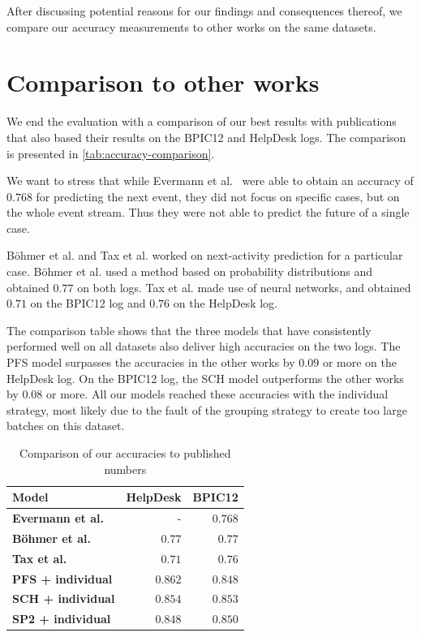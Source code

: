 After discussing potential reasons for our findings and consequences thereof, we compare our accuracy measurements to other works on the same datasets.

\section{Comparison to other works}
We end the evaluation with a comparison of our best results with publications that also based their results on the BPIC12 and HelpDesk logs.
The comparison is presented in \autoref{tab:accuracy-comparison}.

We want to stress that while Evermann et al.~\cite{evermann2016} were able to obtain an accuracy of $0.768$ for predicting the next event, they did not focus on specific cases, but on the whole event stream.
Thus they were not able to predict the future of a single case.

Böhmer et al. and Tax et al. worked on next-activity prediction for a particular case.
Böhmer et al. used a method based on probability distributions and obtained $0.77$ on both logs.
Tax et al. made use of neural networks, and obtained $0.71$ on the BPIC12 log and $0.76$ on the HelpDesk log.

The comparison table shows that the three models that have consistently performed well on all datasets also deliver high accuracies on the two logs.
The PFS model surpasses the accuracies in the other works by $0.09$ or more on the HelpDesk log.
On the BPIC12 log, the SCH model outperforms the other works by $0.08$ or more.
All our models reached these accuracies with the individual strategy, most likely due to the fault of the grouping strategy to create too large batches on this dataset.\\

\begin{table}
\centering
\begin{tabular}{lrr}
\textbf{Model}  &  \textbf{HelpDesk} &  \textbf{BPIC12} \\
\midrule
\textbf{Evermann et al.~\cite{evermann2016}} & - & $0.768$\\
\textbf{Böhmer et al.~\cite{boehmer2018probability}  } & $0.77$ & $0.77$ \\
\textbf{Tax et al.~\cite{tax2017}} & $0.71$ & $0.76$\\
\hline
\textbf{PFS + individual} & $0.862$ & $0.848$ \\
\textbf{SCH + individual} & $0.854$ & $0.853$ \\
\textbf{SP2 + individual} & $0.848$ & $0.850$\\
\end{tabular}
\caption{Comparison of our accuracies to published numbers}
\label{tab:accuracy-comparison}
\end{table}

